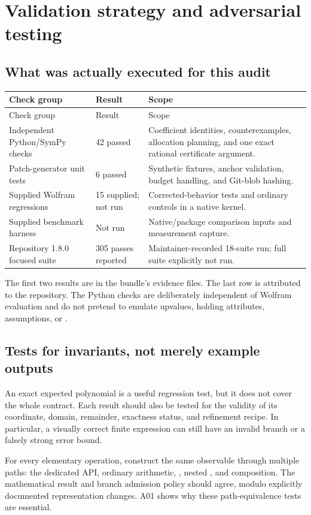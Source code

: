 \section{Validation strategy and adversarial testing}
\subsection{What was actually executed for this audit}
\begin{longtable}{P{0.3\textwidth}P{0.16\textwidth}P{0.44\textwidth}}
\toprule Check group & Result & Scope \\\midrule
\endfirsthead
\toprule Check group & Result & Scope \\\midrule
\endhead
Independent Python/SymPy checks & 42 passed & Coefficient identities, counterexamples, allocation planning, and one exact rational certificate argument. \\
Patch-generator unit tests & 6 passed & Synthetic fixtures, anchor validation, budget handling, and Git-blob hashing. \\
Supplied Wolfram regressions & 15 supplied; not run & Corrected-behavior tests and ordinary controls in a native kernel. \\
Supplied benchmark harness & Not run & Native/package comparison inputs and measurement capture. \\
Repository 1.8.0 focused suite & 305 passes reported & Maintainer-recorded 18-suite run; full suite explicitly not run. \\
\bottomrule
\end{longtable}
The first two results are in the bundle's evidence files. The last row is attributed to the repository. The Python checks are deliberately independent of Wolfram evaluation and do not pretend to emulate upvalues, holding attributes, assumptions, or .\cite{validation}

\subsection{Tests for invariants, not merely example outputs}
An exact expected polynomial is a useful regression test, but it does not cover the whole contract. Each result should also be tested for the validity of its coordinate, domain, remainder, exactness status, and refinement recipe. In particular, a visually correct finite expression can still have an invalid branch or a falsely strong error bound.

For every elementary operation, construct the same observable through multiple paths: the dedicated API, ordinary arithmetic, , nested , and composition. The mathematical result and branch admission policy should agree, modulo explicitly documented representation changes. A01 shows why these path-equivalence tests are essential.

